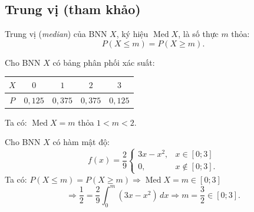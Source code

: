 \subsection{Trung vị (tham khảo)}
Trung vị (\textit{median}) của BNN $X$, ký hiệu $\operatorname{Med} X$, là số thực $m$ thỏa:
\[
P(X \le m) = P(X \ge m).
\]

\begin{vidu}[VD 1]
Cho BNN $X$ có bảng phân phối xác suất:
\begin{center}
\begin{tabular}{|c|c|c|c|c|}
\hline
$X$ & $0$ & $1$ & $2$ & $3$ \\
\hline
$P$ & $0{,}125$ & $0{,}375$ & $0{,}375$ & $0{,}125$ \\
\hline
\end{tabular}
\end{center}
Ta có: $\operatorname{Med} X = m$ thỏa $1 < m < 2$.
\end{vidu}

\begin{vidu}[VD 2]
Cho BNN $X$ có hàm mật độ:
\[
f(x) = \frac{2}{9} \begin{cases}
3x - x^2, & x \in [0; 3] \\
0, & x \notin [0; 3].
\end{cases}
\]
Ta có: $P(X \le m) = P(X \ge m) \Rightarrow \operatorname{Med} X = m \in [0; 3]$
\[
\Rightarrow \frac{1}{2} = \frac{2}{9} \int_0^m (3x - x^2)\,dx \Rightarrow m = \frac{3}{2} \in [0; 3].
\]
\end{vidu}

